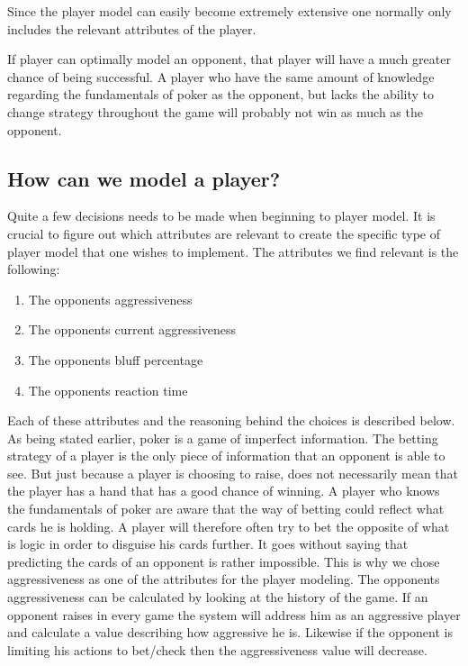 Since the player model can easily become extremely extensive one normally only includes the relevant attributes of the player.

If player can optimally model an opponent, that player will have a much greater chance of being successful. A player who have the same amount of knowledge regarding the fundamentals of poker as the opponent, but lacks the ability to change strategy throughout the game will probably not win as much as the opponent.

\subsection{How can we model a player?}
Quite a few decisions needs to be made when beginning to player model. It is crucial to figure out which attributes are relevant to create the specific type of player model that one wishes to implement.
The attributes we find relevant is the following:
\begin{enumerate}
  \item The opponents aggressiveness
  \item The opponents current aggressiveness
  \item The opponents bluff percentage
  \item The opponents reaction time
\end{enumerate}

Each of these attributes and the reasoning behind the choices is described below.\\

As being stated earlier, poker is a game of imperfect information. The betting strategy of a player is the only piece of information that an opponent is able to see.
But just because a player is choosing to raise, does not necessarily mean that the player has a hand that has a good chance of winning.
A player who knows the fundamentals of poker are aware that the way of betting could reflect what cards he is holding. A player will therefore often try to bet the opposite of what is logic in order to disguise his cards further.
It goes without saying that predicting the cards of an opponent is rather impossible. This is why we chose aggressiveness as one of the attributes for the player modeling.
The opponents aggressiveness can be calculated by looking at the history of the game. If an opponent raises in every game the system will address him as an aggressive player and calculate a value describing how aggressive he is. Likewise if the opponent is limiting his actions to bet/check then the aggressiveness value will decrease. 

